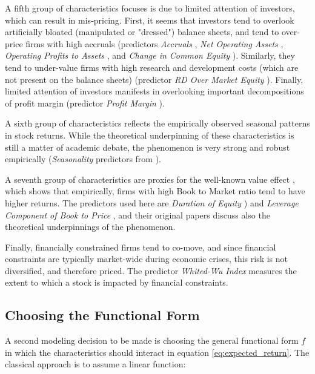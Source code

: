 			A fifth group of characteristics focuses is due to limited attention of investors, which can result in mis-pricing. First, it seems that investors tend to overlook artificially bloated (manipulated or "dressed") balance sheets, and tend to over-price firms with high accruals (predictors \textit{Accruals} \citep{sloan1996create}, \textit{Net Operating Assets} \citep{hirshleifer2004investors}, \textit{Operating Profits to Assets} \citep{ball2016accruals}, and \textit{Change in Common Equity} \cite{richardson2006implications}). Similarly, they tend to under-value firms with high research and development costs (which are not present on the balance sheets) (predictor \textit{ RD Over Market Equity} \cite{chan2001stock}). Finally, limited attention of investors manifests in overlooking important decompositions of profit margin (predictor \textit{Profit Margin} \cite{soliman2008use}).
			
			A sixth group of characteristics reflects the empirically observed seasonal patterns in stock returns. While the theoretical underpinning of these characteristics is still a matter of academic debate, the phenomenon is very strong and robust empirically (\textit{Seasonality} predictors from \cite{heston2008seasonality}). 
			
			A seventh group of characteristics are proxies for the well-known value effect \cite{fama1993common}, which shows that empirically, firms with high Book to Market ratio tend to have higher returns. The predictors used here are \textit{ Duration of Equity }\citep{dechow2004implied}) and \textit{Leverage Component of Book to Price} \citep{penman2007book}, and their original papers discuss also the theoretical underpinnings of the phenomenon.
			
			Finally, financially constrained firms tend to co-move, and since financial constraints are typically market-wide during economic crises, this risk is not diversified, and therefore priced. The predictor \textit{Whited-Wu Index} \citep{whited2006financial} measures the extent to which a stock is impacted by financial constraints. 
		
		
		\subsection{Choosing the Functional Form}
		
			A second modeling decision to be made is choosing the general functional form $f$ in which the characteristics should interact in equation \ref{eq:expected_return}. The classical approach is to assume a linear function: 
			
